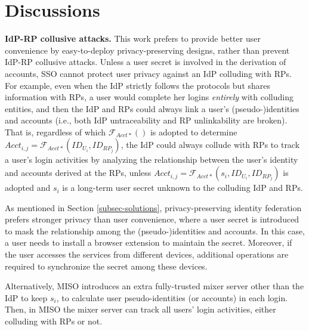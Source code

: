 \section{Discussions}
\label{sec:discussion}

\noindent \textbf{IdP-RP collusive attacks.} 
This work prefers to provide better user convenience by easy-to-deploy privacy-preserving designs,
rather than prevent IdP-RP collusive attacks.
Unless a user secret is involved in the derivation of accounts,
SSO cannot protect user privacy against an IdP colluding with RPs.
For example, even when the IdP strictly follows the protocols but shares information with RPs,
    a user would complete her logins \emph{entirely} with colluding entities,
    and then the IdP and RPs could always link a user's (pseudo-)identities and accounts (i.e., both IdP untraceability and RP unlinkability are broken).
That is, regardless of which $\mathcal{F}_{Acct\ast}()$ is adopted to determine
$Acct_{i,j} = \mathcal{F}_{Acct\ast}(ID_{U_i}, ID_{RP_j})$,
the IdP could always collude with RPs to track a user's login activities by analyzing the relationship between the user's identity and accounts derived at the RPs,
unless $Acct_{i,j} = \mathcal{F}_{Acct\ast}(s_i,ID_{U_i}, ID_{RP_j})$ is adopted and $s_i$ is a long-term user secret unknown to the colluding IdP and RPs.

As mentioned in Section \ref{subsec-solutions}, privacy-preserving identity federation \cite{ELPASSO, UnlimitID, idemix, PseudoID, uprov} prefers stronger privacy than user convenience,
    where a user secret is introduced to mask the relationship among the (pseudo-)identities and accounts.
In this case,
    a user needs to install a browser extension 
            to maintain the secret.
Moreover, if the user accesses the services from different devices,
    additional operations are required to synchronize the secret among these devices.

Alternatively, MISO \cite{miso} introduces an extra fully-trusted mixer server other than the IdP to keep $s_i$,
            to calculate user pseudo-identities (or accounts) in each login.
Then, in MISO the mixer server can track all users' login activities,
   either colluding with RPs or not.


